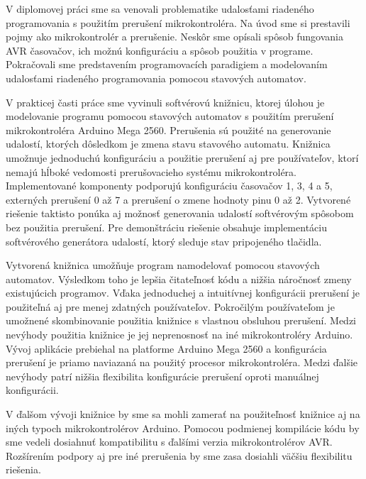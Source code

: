 
V diplomovej práci sme sa venovali problematike udalosťami riadeného programovania s použitím prerušení mikrokontroléra. Na úvod sme si prestavili pojmy ako mikrokontrolér
a prerušenie. Neskôr sme opísali spôsob fungovania AVR časovačov, ich možnú konfiguráciu a spôsob použitia v programe. Pokračovali sme predstavením programovacích paradigiem a modelovaním
udalosťami riadeného programovania pomocou stavových automatov. \par
V prakticej časti práce sme vyvinuli softvérovú knižnicu, ktorej úlohou je modelovanie programu pomocou stavových automatov s použitím prerušení mikrokontroléra Arduino
Mega 2560. Prerušenia sú použité na generovanie udalostí, ktorých dôsledkom je zmena stavu stavového automatu. Knižnica umožnuje jednoduchú konfiguráciu a použitie
prerušení aj pre používateľov, ktorí nemajú hĺboké vedomosti prerušovacieho systému mikrokontroléra. Implementované komponenty podporujú konfiguráciu
časovačov 1, 3, 4 a 5, externých prerušení 0 až 7 a prerušení o zmene hodnoty pinu 0 až 2. Vytvorené riešenie taktisto ponúka aj možnosť generovania
udalostí softvérovým spôsobom bez použitia prerušení. Pre demonštráciu riešenie obsahuje implementáciu softvérového generátora udalostí, ktorý sleduje stav pripojeného
tlačidla.
\par
Vytvorená knižnica umožňuje program namodelovať pomocou stavových automatov. Výsledkom toho je lepšia čitateľnosť kódu a nižšia náročnosť zmeny existujúcich programov.
Vďaka jednoduchej a intuitívnej konfigurácii prerušení je použiteľná aj pre menej zdatných používateľov. Pokročilým používateľom je umožnené skombinovanie použitia
knižnice s vlastnou obsluhou prerušení. Medzi nevýhody použitia knižnice je jej neprenosnosť na iné mikrokontroléry Arduino. Vývoj aplikácie prebiehal na platforme
Arduino Mega 2560 a konfigurácia prerušení je priamo naviazaná na použitý procesor mikrokontroléra. Medzi ďalšie nevýhody patrí nižšia flexibilita konfigurácie
prerušení oproti manuálnej konfigurácii. \par
V ďalšom vývoji knižnice by sme sa mohli zamerať na použiteľnosť knižnice aj na iných typoch mikrokontrolérov Arduino. Pomocou podmienej kompilácie kódu
by sme vedeli dosiahnuť kompatibilitu s ďalšími verzia mikrokontrolérov AVR. Rozšírením podpory aj pre iné prerušenia by sme zasa dosiahli väčšiu flexibilitu
riešenia.